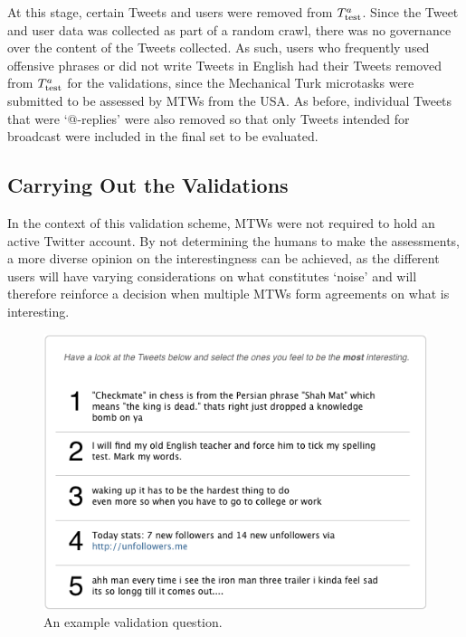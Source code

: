 At this stage, certain Tweets and users were removed from $T^a_{\textrm{test}}{}$. Since the Tweet and user data was collected as part of a random crawl, there was no governance over the content of the Tweets collected. As such, users who frequently used offensive phrases or did not write Tweets in English had their Tweets removed from $T^a_{\textrm{test}}{}$ for the validations, since the Mechanical Turk microtasks were submitted to be assessed by MTWs from the USA. As before, individual Tweets that were `@-replies' were also removed so that only Tweets intended for broadcast were included in the final set to be evaluated.



\subsection{Carrying Out the Validations}
In the context of this validation scheme, MTWs were not required to hold an active Twitter account. By not determining the humans to make the assessments, a more diverse opinion on the interestingness can be achieved, as the different users will have varying considerations on what constitutes `noise' and will therefore reinforce a decision when multiple MTWs form agreements on what is interesting. 

\begin{figure}[h]
\centering
\includegraphics[scale=0.7]{5.Chapter3/Media/questions1.png} 
\caption{An example validation question.}
\label{fig:example_question1}
\end{figure}

